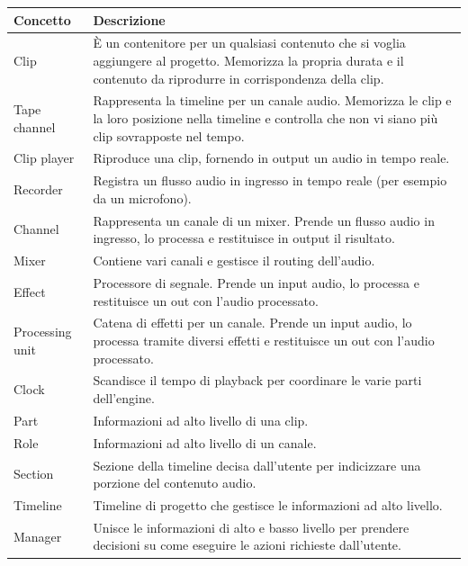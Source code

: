 \documentclass[a4paper,12pt]{report}
\begin{document}
\begin{center}
\begin{longtable}{| m{7em} | m{7cm} |} 
 \hline
 \textbf{Concetto} & \textbf{Descrizione} \\ [0.5ex] 
 \hline
 Clip & È un contenitore per un qualsiasi contenuto che si voglia aggiungere al progetto. Memorizza la propria durata e il contenuto da riprodurre in corrispondenza della clip. \\ 
 \hline
 Tape channel & Rappresenta la timeline per un canale audio. Memorizza le clip e la loro posizione nella timeline e controlla che non vi siano più clip sovrapposte nel tempo. \\
 \hline
 Clip player & Riproduce una clip, fornendo in output un audio in tempo reale. \\
 \hline
 Recorder & Registra un flusso audio in ingresso in tempo reale (per esempio da un microfono). \\
 \hline
 Channel & Rappresenta un canale di un mixer.
Prende un flusso audio in ingresso, lo processa e restituisce in output il risultato. \\ 
 \hline
 Mixer & Contiene vari canali e gestisce il routing dell’audio. \\
 \hline 
 Effect & Processore di segnale. Prende un input audio, lo processa e restituisce un out con l’audio processato. \\
 \hline
 Processing unit & Catena di effetti per un canale. Prende un input audio, lo processa tramite diversi effetti e restituisce un out con l’audio processato. \\
 \hline
 Clock & Scandisce il tempo di playback per coordinare le varie parti dell’engine. \\
 \hline
 Part & Informazioni ad alto livello di una clip. \\
 \hline
 Role & Informazioni ad alto livello di un canale. \\
\hline
Section & Sezione della timeline decisa dall’utente per indicizzare una porzione del contenuto audio. \\
\hline
Timeline & Timeline di progetto che gestisce le informazioni ad alto livello. \\
\hline
Manager & Unisce le informazioni di alto e basso livello per prendere decisioni su come eseguire le azioni richieste dall’utente. \\
\hline
\end{longtable}
\end{center}
\end{document}
